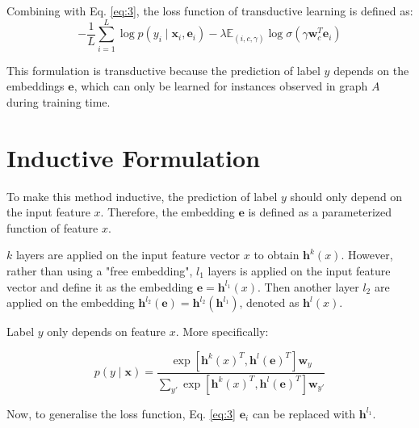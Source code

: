 \documentclass{article}
\begin{document}
Combining with Eq. \ref{eq:3}, the loss function of transductive learning is defined as:
\begin{equation}
  -\frac{1}{L} \sum^L_{i=1} \log p(y_i \mid \mathbf{x}_i,\mathbf{e}_i) -
  \lambda \mathbb{E}_{(i,c,\gamma)} \log \sigma (\gamma \mathbf{w}^T_c
  \mathbf{e}_i)
  \label{eq:5}
\end{equation}

This formulation is transductive because the prediction of label $y$ depends on
the embeddings $\mathbf{e}$, which can only be learned for instances observed
in graph $A$ during training time.

\section{Inductive Formulation}
To make this method inductive, the prediction of label $y$ should only depend
on the input feature $x$. Therefore, the embedding $\mathbf{e}$ is defined as a
parameterized function of feature $x$.

$k$ layers are applied on the input feature vector $x$ to obtain
$\mathbf{h}^k(x)$. However, rather than using a "free embedding", $l_1$ layers
is applied on the input feature vector and define it as the embedding
$\mathbf{e} = \mathbf{h}^{l_1}(x)$. Then another layer $l_2$ are applied on the
embedding $\mathbf{h}^{l_2}(\mathbf{e}) = \mathbf{h}^{l_2}(\mathbf{h}^{l_1})$,
denoted as $\mathbf{h}^l(x)$.

Label $y$ only depends on feature $x$. More specifically:

\begin{equation}
  p(y \mid \mathbf{x}) = \frac{\exp[\mathbf{h}^k(x)^T,
  \mathbf{h}^l(\mathbf{e})^T]\mathbf{w}_y} {\sum_{y'} \exp [\mathbf{h}^k(x)^T,
  \mathbf{h}^l(\mathbf{e})^T]\mathbf{w}_{y'}}
  \label{eq:6}
\end{equation}

Now, to generalise the loss function, Eq. \ref{eq:3} $\mathbf{e}_i$ can be
replaced with $\mathbf{h}^{l_1}$.
\end{document}
